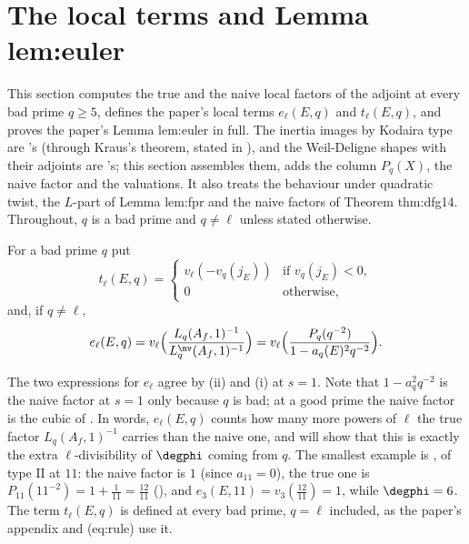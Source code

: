\section{The local terms and Lemma lem:euler}\label{sec:lfunctions:local-terms}

This section computes the true and the naive local factors of the adjoint at every bad prime $q\ge5$, defines the paper's local terms $e_\ell(E,q)$ and
$t_\ell(E,q)$, and proves the paper's Lemma lem:euler in full. The inertia images by Kodaira type are 's (through Kraus's theorem, stated in
), and the Weil-Deligne shapes with their adjoints are 's; this section assembles them, adds the column $P_q(X)$, the naive factor
and the valuations. It also treats the behaviour under quadratic twist, the $L$-part of Lemma lem:fpr and the naive factors of Theorem thm:dfg14. Throughout,
$q$ is a bad prime and $q\ne\ell$ unless stated otherwise.

\begin{definition}\label{def:lfunctions:terms}
For a bad prime $q$ put
\[
t_\ell(E,q)=\begin{cases}v_\ell(-v_q(j_E))&\text{if }v_q(j_E)<0,\\0&\text{otherwise,}\end{cases}
\]
and, if $q\ne\ell$,
\[
e_\ell(E,q)=v_\ell\Bigl(\frac{L_q(A_f,1)^{-1}}{L_q^{\nv}(A_f,1)^{-1}}\Bigr)=v_\ell\Bigl(\frac{P_q(q^{-2})}{1-a_q(E)^2q^{-2}}\Bigr).
\]
\end{definition}

The two expressions for $e_\ell$ agree by (ii) and (i) at $s=1$. Note that $1-a_q^2q^{-2}$ is the naive factor at $s=1$ only
because $q$ is bad; at a good prime the naive factor is the cubic of . In words, $e_\ell(E,q)$ counts how many more powers of $\ell$ the true
factor $L_q(A_f,1)^{-1}$ carries than the naive one, and  will show that this is exactly the extra $\ell$-divisibility of $\degphi$ coming from
$q$. The smallest example is , of type $\mathrm{II}$ at $11$: the naive factor is $1$ (since $a_{11}=0$), the true one is $P_{11}(11^{-2})=1+\frac1{11}=\frac{12}{11}$
(), and $e_3(E,11)=v_3(\frac{12}{11})=1$, while $\degphi=6$. The term $t_\ell(E,q)$ is defined at every bad prime,
$q=\ell$ included, as the paper's appendix and (eq:rule) use it.

